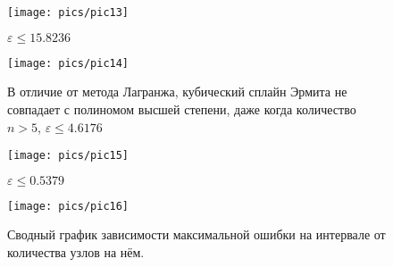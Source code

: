 \begin{figure}[H]
    \centering
    \caption{$\varepsilon \le 15.8236$}
    \texttt{[image: pics/pic13]}
    \label{pic:13}
\end{figure}
\begin{figure}[H]
    \centering
    \caption{В отличие от метода Лагранжа, кубический сплайн Эрмита не совпадает с полиномом высшей степени, даже когда количество $n>5$, $\varepsilon \le 4.6176$}
    \texttt{[image: pics/pic14]}
    \label{pic:14}
\end{figure}
\begin{figure}[H]
    \centering
    \caption{$\varepsilon \le 0.5379$}
    \texttt{[image: pics/pic15]}
    \label{pic:15}
\end{figure}
\begin{figure}[H]
    \centering
    \caption{Сводный график зависимости максимальной ошибки на интервале от количества узлов на нём.}
    \texttt{[image: pics/pic16]}
    \label{pic:16}
\end{figure}